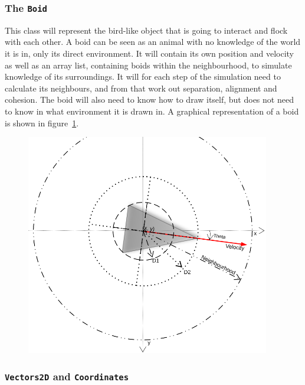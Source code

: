 \documentclass[a4paper,twoside, 10pt]{report}
\newcommand{\code}[1]{\texttt{#1}}
\begin{document}
\begin{minipage}[T]{0.35\textwidth}
\subsubsection{The \code{Boid}}
\label{subsubsec:Boid}
This class will represent the bird-like object that is going to interact and flock with each other. A boid can be seen as an animal with no knowledge of the world it is in, only its direct environment. It will contain its own position and velocity as well as an array list, containing boids within the neighbourhood, to simulate knowledge of its surroundings. It will for each step of the simulation need to calculate its neighbours, and from that work out separation, alignment and cohesion. The boid will also need to know how to draw itself, but does not need to know in what environment it is drawn in. A graphical representation of a boid is shown in figure~\ref{fig:boid}.
\hfill
\end{minipage}
%
\begin{minipage}[T]{0.65\textwidth}
  \begin{figure}[H]
    \hfill
    \includegraphics[width = 0.95\textwidth]{images/BoidBuild.png}
    \label{fig:boid}
    \abovecaptionskip
    \belowcaptionskip
  \end{figure}
\end{minipage}

\subsubsection{\code{Vectors2D} and \code{Coordinates}}
\end{document}
